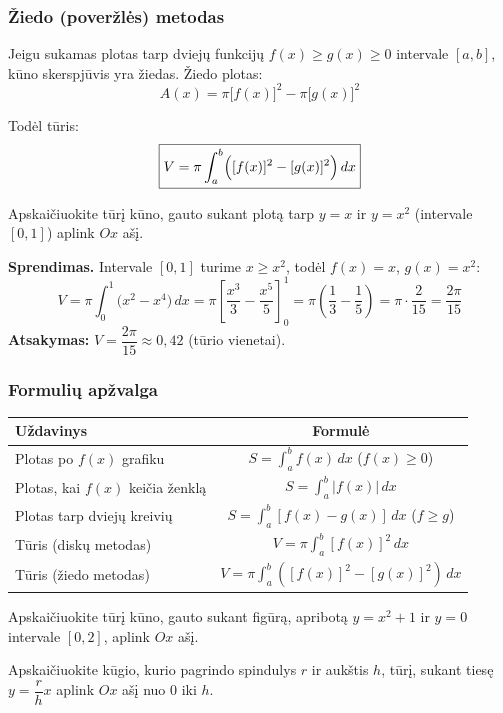 \subsubsection{Žiedo (poveržlės) metodas}

Jeigu sukamas plotas tarp dviejų funkcijų $f(x) \geq g(x) \geq 0$ intervale $[a, b]$, kūno skerspjūvis yra žiedas. Žiedo plotas:
\[
A(x) = \pi \bigl[f(x)\bigr]^2 - \pi \bigl[g(x)\bigr]^2
\]

Todėl tūris:
\[
\boxed{V = \pi \int_a^b \Bigl([f(x)]^2 - [g(x)]^2\Bigr)\, dx}
\]

\begin{example}
Apskaičiuokite tūrį kūno, gauto sukant plotą tarp $y = x$ ir $y = x^2$ (intervale $[0,1]$) aplink $Ox$ ašį.

\textbf{Sprendimas.} Intervale $[0,1]$ turime $x \geq x^2$, todėl $f(x) = x$, $g(x) = x^2$:
\[
V = \pi \int_0^1 \bigl(x^2 - x^4\bigr)\, dx = \pi \left[\frac{x^3}{3} - \frac{x^5}{5}\right]_0^1 = \pi\left(\frac{1}{3} - \frac{1}{5}\right) = \pi \cdot \frac{2}{15} = \frac{2\pi}{15}
\]
\textbf{Atsakymas:} $V = \dfrac{2\pi}{15} \approx 0{,}42$ (tūrio vienetai).
\end{example}

\subsubsection{Formulių apžvalga}

\begin{tcolorbox}[title={Pagrindinės integralų taikymo formulės}, colback=blue!5!white, colframe=blue!60!black]
\begin{center}
\renewcommand{\arraystretch}{2}
\begin{tabular}{|l|c|}
\hline
\textbf{Uždavinys} & \textbf{Formulė} \\
\hline
Plotas po $f(x)$ grafiku & $\displaystyle S = \int_a^b f(x)\, dx$ \quad ($f(x) \geq 0$) \\
\hline
Plotas, kai $f(x)$ keičia ženklą & $\displaystyle S = \int_a^b |f(x)|\, dx$ \\
\hline
Plotas tarp dviejų kreivių & $\displaystyle S = \int_a^b [f(x) - g(x)]\, dx$ \quad ($f \geq g$) \\
\hline
Tūris (diskų metodas) & $\displaystyle V = \pi \int_a^b [f(x)]^2\, dx$ \\
\hline
Tūris (žiedo metodas) & $\displaystyle V = \pi \int_a^b \left([f(x)]^2 - [g(x)]^2\right)\, dx$ \\
\hline
\end{tabular}
\end{center}
\end{tcolorbox}

\begin{exercise}
Apskaičiuokite tūrį kūno, gauto sukant figūrą, apribotą $y = x^2 + 1$ ir $y = 0$ intervale $[0, 2]$, aplink $Ox$ ašį.
\end{exercise}

\begin{exercise}
Apskaičiuokite kūgio, kurio pagrindo spindulys $r$ ir aukštis $h$, tūrį, sukant tiesę $y = \dfrac{r}{h}x$ aplink $Ox$ ašį nuo $0$ iki $h$.
\end{exercise}

